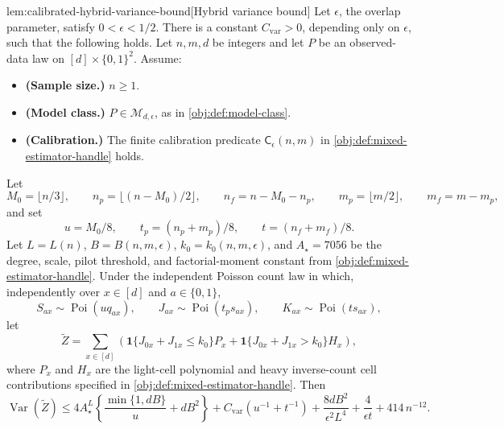 \documentclass[11pt]{article}
\begin{document}
\begin{lemmav}{lem:calibrated-hybrid-variance-bound}[Hybrid variance bound]
Let \(\epsilon\), the overlap parameter, satisfy \(0<\epsilon<1/2\). There is a constant \(C_{\mathrm{var}}>0\), depending only on \(\epsilon\), such that the following holds. Let \(n,m,d\) be integers and let \(P\) be an observed-data law on \([d]\times\{0,1\}^2\). Assume:
\begin{itemize}
\item \textbf{(Sample size.)} \(n\ge 1\).
\item \textbf{(Model class.)} \(P\in\mathcal M_{d,\epsilon}\), as in \cref{obj:def:model-class}.
\item \textbf{(Calibration.)} The finite calibration predicate \(\mathsf C_\epsilon(n,m)\) in \cref{obj:def:mixed-estimator-handle} holds.
\end{itemize}
Let
\[
M_0=\lfloor n/3\rfloor,\qquad
n_p=\bigl\lfloor (n-M_0)/2\bigr\rfloor,\qquad
n_f=n-M_0-n_p,\qquad
m_p=\lfloor m/2\rfloor,\qquad
m_f=m-m_p,
\]
and set
\[
u=M_0/8,\qquad
t_p=(n_p+m_p)/8,\qquad
t=(n_f+m_f)/8.
\]
Let \(L=L(n)\), \(B=B(n,m,\epsilon)\), \(k_0=k_0(n,m,\epsilon)\), and \(A_\star=7056\) be the degree, scale, pilot threshold, and factorial-moment constant from \cref{obj:def:mixed-estimator-handle}. Under the independent Poisson count law in which, independently over \(x\in[d]\) and \(a\in\{0,1\}\),
\[
S_{ax}\sim\operatorname{Poi}(u q_{ax}),\qquad
J_{ax}\sim\operatorname{Poi}(t_p s_{ax}),\qquad
K_{ax}\sim\operatorname{Poi}(t s_{ax}),
\]
let
\[
\widetilde Z
=
\sum_{x\in[d]}
\left(
\mathbf 1\{J_{0x}+J_{1x}\le k_0\}P_x
+
\mathbf 1\{J_{0x}+J_{1x}>k_0\}H_x
\right),
\]
where \(P_x\) and \(H_x\) are the light-cell polynomial and heavy inverse-count cell contributions specified in \cref{obj:def:mixed-estimator-handle}. Then
\[
\operatorname{Var}(\widetilde Z)
\le
4A_\star^L
\left\{
\frac{\min\{1,dB\}}{u}+dB^2
\right\}
+
C_{\mathrm{var}}\left(u^{-1}+t^{-1}\right)
+
\frac{8dB^2}{\epsilon^2L^4}
+
\frac{4}{\epsilon t}
+
414\,n^{-12}.
\]
\end{lemmav}
\end{document}
